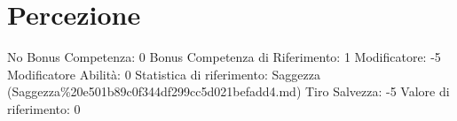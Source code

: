 \section{Percezione}\label{percezione}

\begin{description}
\tightlist
\item[Tags: ABI]
No Bonus Competenza: 0 Bonus Competenza di Riferimento: 1 Modificatore:
-5 Modificatore Abilità: 0 Statistica di riferimento: Saggezza
(Saggezza\%20e501b89c0f344df299cc5d021befadd4.md) Tiro Salvezza: -5
Valore di riferimento: 0
\end{description}
